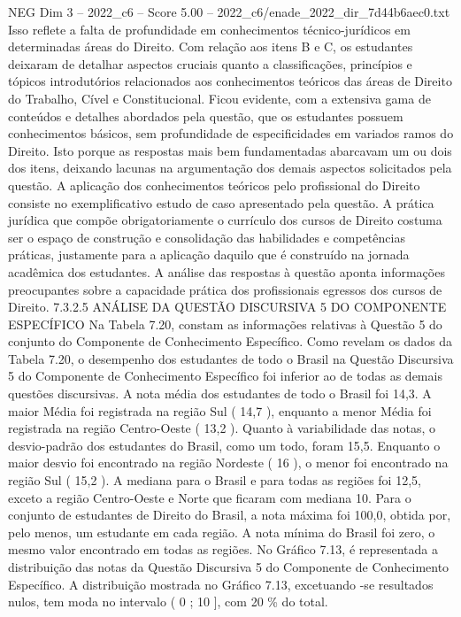 \begin{textsample}{NEG Dim 3 – 2022\_c6 – Score 5.00 – 2022\_c6/enade\_2022\_dir\_7d44b6aec0.txt}
Isso reflete a falta de profundidade em conhecimentos técnico-jurídicos em determinadas áreas do Direito.
Com relação aos itens B e C, os estudantes deixaram de detalhar aspectos cruciais quanto a classificações, princípios e tópicos introdutórios relacionados aos conhecimentos teóricos das áreas de Direito do Trabalho, Cível e Constitucional.
Ficou evidente, com a extensiva gama de conteúdos e detalhes abordados pela questão, que os estudantes possuem conhecimentos básicos, sem profundidade de especificidades em variados ramos do Direito.
Isto porque as respostas mais bem fundamentadas abarcavam um ou dois dos itens, deixando lacunas na argumentação dos demais aspectos solicitados pela questão.
A aplicação dos conhecimentos teóricos pelo profissional do Direito consiste no exemplificativo estudo de caso apresentado pela questão.
A prática jurídica que compõe obrigatoriamente o currículo dos cursos de Direito costuma ser o espaço de construção e consolidação das habilidades e competências práticas, justamente para a aplicação daquilo que é construído na jornada acadêmica dos estudantes.
A análise das respostas à questão aponta informações preocupantes sobre a capacidade prática dos profissionais egressos dos cursos de Direito. 7.3.2.5 ANÁLISE DA QUESTÃO DISCURSIVA 5 DO COMPONENTE ESPECÍFICO Na Tabela 7.20, constam as informações relativas à Questão 5 do conjunto do Componente de Conhecimento Específico.
Como revelam os dados da Tabela 7.20, o desempenho dos estudantes de todo o Brasil na Questão Discursiva 5 do Componente de Conhecimento Específico foi inferior ao de todas as demais questões discursivas.
A nota média dos estudantes de todo o Brasil foi 14,3.
A maior Média foi registrada na região Sul ( 14,7 ), enquanto a menor Média foi registrada na região Centro-Oeste ( 13,2 ).
Quanto à variabilidade das notas, o desvio-padrão dos estudantes do Brasil, como um todo, foram 15,5.
Enquanto o maior desvio foi encontrado na região Nordeste ( 16 ), o menor foi encontrado na região Sul ( 15,2 ).
A mediana para o Brasil e para todas as regiões foi 12,5, exceto a região Centro-Oeste e Norte que ficaram com mediana 10.
Para o conjunto de estudantes de Direito do Brasil, a nota máxima foi 100,0, obtida por, pelo menos, um estudante em cada região.
A nota mínima do Brasil foi zero, o mesmo valor encontrado em todas as regiões.
No Gráfico 7.13, é representada a distribuição das notas da Questão Discursiva 5 do Componente de Conhecimento Específico.
A distribuição mostrada no Gráfico 7.13, excetuando -se resultados nulos, tem moda no intervalo ( 0 ; 10 ], com 20 \% do total.

\end{textsample}
